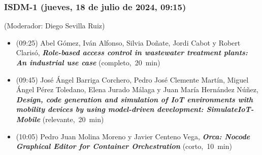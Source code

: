 \begin{frame}
  \frametitle{ISDM-1 (jueves, 18 de julio de 2024, 09:15)}
{\small (Moderador: Diego Sevilla Ruiz)}
\begin{itemize}


\item {(09:25) Abel Gómez, Iván Alfonso, Silvia Doñate, Jordi Cabot y Robert Clarisó}, %
      {\bfseries\itshape Role-based access control in wastewater treatment plants: An industrial use case} %
      {(completo,~20~min)}
      

\item {(09:45) José Ángel Barriga Corchero, Pedro José Clemente Martín, Miguel Ángel Pérez Toledano, Elena Jurado Málaga y Juan María Hernández Núñez}, %
      {\bfseries\itshape Design, code generation and simulation of IoT environments with mobility devices by using model-driven development: SimulateIoT-Mobile} %
      {(relevante,~20~min)}
      

\item {(10:05) Pedro Juan Molina Moreno y Javier Centeno Vega}, %
      {\bfseries\itshape Orca: Nocode Graphical Editor for Container Orchestration} %
      {(corto,~10~min)}
      

\end{itemize}
\end{frame}